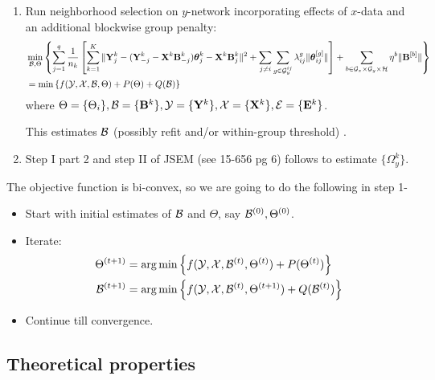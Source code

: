\begin{enumerate}
\item Run neighborhood selection on $y$-network incorporating effects of $x$-data and an additional blockwise group penalty:
%
\begin{align}
& \min_{{\cal{B}}, \Theta} \left\{ \sum_{j=1}^q  \frac{1}{n_k} \left[ \sum_{k=1}^K \| {\mathbf{Y}}^k_j - ({\mathbf{Y}}_{-j}^k - {\mathbf{X}}^k {\mathbf{B}}_{-j}^k) {\boldsymbol{\theta}}_j^k - {\mathbf{X}}^k {\mathbf{B}}_j^k \|^2 + \sum_{j \neq i} \sum_{g \in {\cal{G}}_y^{ij}} \lambda_{ij}^g \| {\boldsymbol{\theta}}_{ij}^{[g]} \| \right] + \sum_{b \in {\cal{G}}_x \times {\cal{G}}_y \times {\cal{H}}} \eta^b \| {\mathbf{B}}^{[b]} \| \right\}\\
&= \min \left\{ f ( {\cal{Y}}, {\cal{X}}, {\cal{B}}, \Theta) + P (\Theta) + Q ({\cal{B}}) \right\} 
\end{align}
%
where $\Theta = \{ \Theta_i \}, {\cal{B}} = \{ {\mathbf{B}}^k \}, {\cal{Y}} = \{ {\mathbf{Y}}^k \}, {\cal{X}} = \{ {\mathbf{X}}^k \}, {\cal{E}} = \{ {\mathbf{E}}^k \}$.

This estimates ${\cal{B}}$ { \colrbf (possibly refit and/or within-group threshold) }.

\item Step I part 2 and step II of JSEM (see 15-656 pg 6) follows to estimate $\{ \Omega_y^k \}$.
\end{enumerate}

The objective function is bi-convex, so we are going to do the following in step 1-

\begin{itemize}
\item Start with initial estimates of ${\cal{B}}$ and $\Theta$, say ${\cal{B}}^{(0)}, \Theta^{(0)}$.
\item Iterate:
%
\begin{align}
\Theta^{(t+1)} &= \operatorname*{arg\,min} \left\{ f ( {\cal{Y}}, {\cal{X}}, {\cal{B}}^{(t)}, \Theta^{(t)}) + P (\Theta^{(t)}) \right\}\\
{\cal{B}}^{(t+1)} &= \operatorname*{arg\,min} \left\{ f ( {\cal{Y}}, {\cal{X}}, {\cal{B}}^{(t)}, \Theta^{(t+1)}) + Q ({\cal{B}}^{(t)}) \right\}
\end{align}
\item Continue till convergence.
\end{itemize}
%

\subsection{Theoretical properties}




